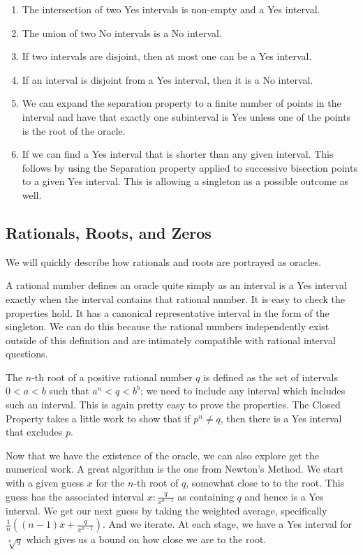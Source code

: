 \documentclass[12pt]{article}
\theoremstyle{remark}
\begin{document}
\begin{enumerate}
    \item The intersection of two Yes intervals is non-empty and a Yes interval. 
    \item The union of two No intervals is a No interval. 
    \item If two intervals are disjoint, then at most one can be a Yes interval. 
    \item If an interval is disjoint from a Yes interval, then it is a No interval. 
    \item We can expand the separation property to a finite number of points in the interval and have that exactly one subinterval is Yes unless one of the points is the root of the oracle. 
    \item If we can find a Yes interval that is shorter than any given interval. This follows by using the Separation property applied to successive bisection points to a given Yes interval. This is allowing a singleton as a possible outcome as well.
\end{enumerate}

\subsection{Rationals, Roots, and Zeros}

We will quickly describe how rationals and roots are portrayed as oracles. 

A rational number defines an oracle quite simply as an interval is a Yes interval exactly when the interval contains that rational number. It is easy to check the properties hold. It has a canonical representative interval in the form of the singleton. We can do this because the rational numbers independently exist outside of this definition and are intimately compatible with rational interval questions. 

The $n$-th root of a positive rational number $q$ is defined as the set of intervals $0< a < b$ such that $a^n < q < b^b$; we need to include any interval which includes such an interval. This is again pretty easy to prove the properties. The Closed Property takes a little work to show that if $p^n \neq q$, then there is a Yes interval that excludes $p$. 

Now that we have the existence of the oracle, we can also explore get the numerical work. A great algorithm is the one from Newton's Method. We start with a given guess $x$ for the $n$-th root of $q$, somewhat close to to the root. This guess has the associated interval $x:\frac{q}{x^{n-1}}$ as containing $q$ and hence is a Yes interval.  We get our next guess by taking the weighted average, specifically $\frac{1}{n}( (n-1) x + \frac{q}{x^{n-1}} )$. And we iterate. At each stage, we have a Yes interval for $\sqrt[n]{q}$ which gives us a bound on how close we are to the root. 
\end{document}
